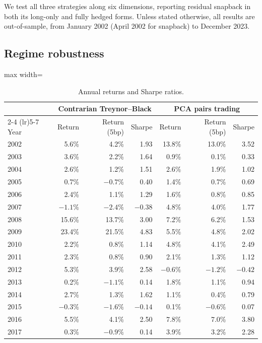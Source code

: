 \documentclass[12pt,letterpaper]{article}
\begin{document}
We test all three strategies along six dimensions, reporting residual snapback in both its long-only and fully hedged forms. Unless stated otherwise, all results are out-of-sample, from January 2002 (April 2002 for snapback) to December 2023.

\subsection{Regime robustness}

\begin{table}[!htbp]
\centering
\caption{Annual returns and Sharpe ratios.}
\label{tab:yearly}
\begin{adjustbox}{max width=\linewidth}
\begin{tabular}{lrrrrrr}
\toprule
& \multicolumn{3}{c}{Contrarian Treynor--Black} & \multicolumn{3}{c}{PCA pairs trading} \\
\cmidrule(lr){2-4} \cmidrule(lr){5-7}
Year & Return & Return (5bp) & Sharpe & Return & Return (5bp) & Sharpe \\
\midrule
2002 & 5.6\% & 4.2\% & 1.93 & 13.8\% & 13.0\% & 3.52 \\
2003 & 3.6\% & 2.2\% & 1.64 & 0.9\% & 0.1\% & 0.33 \\
2004 & 2.6\% & 1.2\% & 1.51 & 2.6\% & 1.9\% & 1.02 \\
2005 & 0.7\% & $-0.7\%$ & 0.40 & 1.4\% & 0.7\% & 0.69 \\
2006 & 2.4\% & 1.1\% & 1.29 & 1.6\% & 0.8\% & 0.85 \\
2007 & $-1.1\%$ & $-2.4\%$ & $-0.38$ & 4.8\% & 4.0\% & 1.77 \\
2008 & 15.6\% & 13.7\% & 3.00 & 7.2\% & 6.2\% & 1.53 \\
2009 & 23.4\% & 21.5\% & 4.83 & 5.5\% & 4.8\% & 2.02 \\
2010 & 2.2\% & 0.8\% & 1.14 & 4.8\% & 4.1\% & 2.49 \\
2011 & 2.3\% & 0.8\% & 0.90 & 2.1\% & 1.3\% & 1.12 \\
2012 & 5.3\% & 3.9\% & 2.58 & $-0.6\%$ & $-1.2\%$ & $-0.42$ \\
2013 & 0.2\% & $-1.1\%$ & 0.14 & 1.8\% & 1.1\% & 0.94 \\
2014 & 2.7\% & 1.3\% & 1.62 & 1.1\% & 0.4\% & 0.79 \\
2015 & $-0.3\%$ & $-1.6\%$ & $-0.14$ & 0.1\% & $-0.6\%$ & 0.07 \\
2016 & 5.5\% & 4.1\% & 2.50 & 7.8\% & 7.0\% & 3.80 \\
2017 & 0.3\% & $-0.9\%$ & 0.14 & 3.9\% & 3.2\% & 2.28 \\

\end{tabular}
\end{adjustbox}
\end{table}
\end{document}
